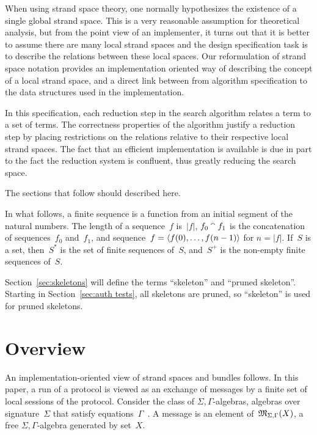 \documentclass[12pt]{article}
\theoremstyle{definition}
\newenvironment{note}{\itshape\par\noindent}{}
\begin{document}
When using strand space theory, one normally hypothesizes the
existence of a single global strand space.  This is a very reasonable
assumption for theoretical analysis, but from the point view of an
implementer, it turns out that it is better to assume there are many
local strand spaces and the design specification task is to describe
the relations between these local spaces.  Our reformulation of strand
space notation provides an implementation oriented way of describing
the concept of a local strand space, and a direct link between from
algorithm specification to the data structures used in the
implementation.

In this specification, each reduction step in the search algorithm
relates a term to a set of terms.  The correctness properties of the
algorithm justify a reduction step by placing restrictions on the
relations relative to their respective local strand spaces.  The fact
that an efficient implementation is available is due in part to the
fact the reduction system is confluent, thus greatly reducing the
search space.

\begin{note}
The sections that follow should described here.
\end{note}

In what follows, a finite sequence is a function from an initial
segment of the natural numbers.  The length of a sequence~$f$
is~$|f|$, $f_0\mathbin{{}^\smallfrown} f_1$ is the concatenation of sequences~$f_0$
and~$f_1$, and sequence~$f=\langle f(0),\ldots,f(n-1)\rangle$ for $n=|f|$.
If~$S$ is a set, then~$S^\ast$ is the set of finite sequences of~$S$,
and~$S^+$ is the non-empty finite sequences of~$S$.  

Section~\ref{sec:skeletons} will define the terms ``skeleton'' and
``pruned skeleton''.  Starting in Section~\ref{sec:auth tests}, all
skeletons are pruned, so ``skeleton'' is used for pruned skeletons.

\section{Overview}\label{sec:overview}

An implementation-oriented view of strand spaces and bundles
\cite{ThayerEtal99} follows.  In this paper, a run of a protocol is
viewed as an exchange of messages by a finite set of local sessions of
the protocol.  Consider the class of $\Sigma,\Gamma$-algebras,
algebras over signature~$\Sigma$ that satisfy
equations~$\Gamma$~\cite[Chapter~3]{BaaderNipkow98}.  A message is an
element of~$\mathfrak M_{\Sigma,\Gamma}(X)$, a free
$\Sigma,\Gamma$-algebra generated by set~$X$.
\end{document}
